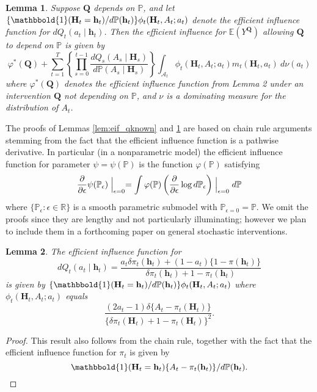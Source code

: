 \documentclass[12pt]{article}
\newcommand{\Pb}{\mathbb{P}}
\newcommand{\E}{\mathbb{E}}
\newcommand{\R}{\mathbb{R}}
\newcommand{\bH}{\mathbf{H}}
\newcommand{\bh}{\mathbf{h}}
\newcommand{\bQ}{\mathbf{Q}}
\newcommand{\one}{\mathbbold{1}}
\newtheorem{lemma}{Lemma}
\theoremstyle{remark}
\begin{document}
\begin{lemma}
\label{lem:contribution}
Suppose $\bQ$ depends on $\Pb$, and let $\{\one(\bH_t=\bh_t)/d\Pb(\bh_t) \} \phi_t(\bH_t, A_t; a_t)$ 
denote the efficient influence function for $dQ_t(a_t \mid \bh_t)$. Then the efficient influence for $\E(Y^\bQ)$ allowing $\bQ$ to depend on $\Pb$ is given by
$$ \varphi^*(\bQ) + \sum_{t=1}^T \left\{ \prod_{s=0}^{t-1}  \frac{ dQ_s(A_s \mid \bH_s) }{ d\Pb(A_s \mid \bH_s) } \right\} \int_{\mathcal{A}_t} \phi_t(\bH_t,A_t; a_t) m_t( \bH_t, a_t) \ d\nu(a_t) $$
where $\varphi^*(\bQ)$ denotes the efficient influence function from Lemma 2 under an intervention $\bQ$ not depending on $\Pb$, and $\nu$ is a dominating measure for the distribution of $A_t$.
\end{lemma}
 
The proofs of Lemmas \ref{lem:eif_qknown} and \ref{lem:contribution} are based on chain rule arguments stemming from the fact that the efficient influence function is a pathwise derivative. In particular (in a nonparametric model) the efficient influence function for parameter $\psi=\psi(\Pb)$ is the function $\varphi(\Pb)$ satisfying
$$ \frac{\partial}{\partial \epsilon} \psi(\Pb_\epsilon) \Bigm|_{\epsilon=0} = \int \varphi(\Pb) \left( \frac{\partial}{\partial \epsilon} \log d\Pb_\epsilon \right) \Bigm|_{\epsilon=0} d\Pb $$
where $\{\Pb_\epsilon : \epsilon \in \R\} $ is a smooth parametric submodel with $\Pb_{\epsilon=0}=\Pb$. We omit the proofs since they are lengthy and not particularly illuminating; however we plan to include them in a forthcoming paper on general stochastic interventions.

\begin{lemma}
\label{lem:eif_contribution}
The efficient influence function for 
$$dQ_t(a_t \mid \bh_t) = \frac{a_t \delta \pi_t(\bh_t) + (1-a_t) \{1-\pi(\bh_t)\}}{\delta \pi_t(\bh_t) + 1-\pi_t(\bh_t)} $$
is given by $\{\one(\bH_t=\bh_t)/d\Pb(\bh_t) \} \phi_t(\bH_t, A_t; a_t)$ where $\phi_t(\bH_t, A_t; a_t)$ equals
$$ \frac{ (2 a_t-1) \delta \{A_t - \pi_t(\bH_t)\}}{ \{ \delta \pi_t(\bH_t) + 1-\pi_t(\bH_t)\}^2}  . $$
\end{lemma}

\begin{proof}
This result also follows from the chain rule, together with the fact that the efficient influence function for $\pi_t$ is given by
$$ \one(\bH_t=\bh_t) \{A_t - \pi_t(\bh_t)\} / d\Pb(\bh_t) . $$ 
\end{proof}
\end{document}
